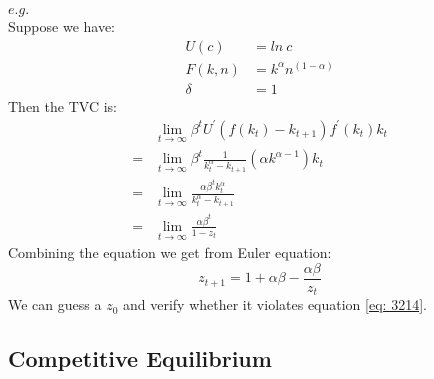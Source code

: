 \documentclass{article}
\begin{document}
$e.g.$\\
Suppose we have:
\begin{align*}
	U(c) &= ln\ c\\
	F(k, n) &= k^\alpha n^{(1-\alpha)}\\
	\delta &= 1
\end{align*}
Then the TVC is:
\begin{align}
	&\lim\limits_{t \to \infty} \beta^t U^\prime(f(k_t) - k_{t+1}) f^\prime(k_t) k_t \nonumber\\
	=& \lim\limits_{t \to \infty} \beta^t \frac{1}{k^\alpha_t - k_{t+1}} (\alpha k^{\alpha-1}) k_t \nonumber\\
	=& \lim\limits_{t \to \infty} \frac{\alpha \beta^t k^\alpha_t}{k^\alpha_t - k_{t+1}} \nonumber\\
	=& \lim\limits_{t \to \infty} \frac{\alpha \beta ^t}{1 - z_t} \label{eq: 3214}
\end{align}
Combining the equation we get from Euler equation:
\begin{equation}
	 z_{t+1} = 1 + \alpha \beta - \frac{\alpha \beta}{z_t}
\end{equation}
We can guess a $z_0$ and verify whether it violates equation \eqref{eq: 3214}.


\subsection{Competitive Equilibrium}
\end{document}
